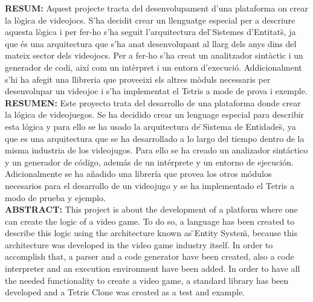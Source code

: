 \documentclass{book}
\begin{document}
\begin{onehalfspace}

{\bf RESUM:} Aquest projecte tracta del desenvolupament d'una plataforma on crear la lògica de videojocs. S'ha decidit crear un llenguatge especial per a descriure aquesta lògica i per fer-ho s'ha seguit l'arquitectura del \"{}Sistemes d'Entitats\"{}, ja que és una arquitectura que s'ha anat desenvolupant al llarg dels anys dins del mateix sector dels videojocs. Per a fer-ho s'ha creat un analitzador sintàctic i un generador de codi, així com un intèrpret i un entorn d'execució. Addicionalment s'hi ha afegit una llibreria que proveeixi els altres mòduls necessaris per desenvolupar un videojoc i s'ha implementat el Tetris a mode de prova i exemple.
\\

{\bf RESUMEN:} Este proyecto trata del desarrollo de una plataforma donde crear la lógica de videojuegos. Se ha decidido crear un lenguage especial para describir esta lógica y para ello se ha usado la arquitectura de \"{}Sistema de Entidades\"{}, ya que es una arquitectura que se ha desarrollado a lo largo del tiempo dentro de la misma industria de los videojugos. Para ello se ha creado un analizador sintáctico y un generador de código, además de un intérprete y un entorno de ejecución. Adicionalmente se ha añadido una librería que provea los otros módulos necesarios para el desarrollo de un videojugo y se ha implementado el Tetris a modo de prueba y ejemplo.
\\

{\bf ABSTRACT:} This project is about the development of a platform where one can create the logic of a video game. To do so, a language has been created to describe this logic using the architecture known as \"{}Entity System\"{}, because this architecture was developed in the video game industry itself. In order to accomplish that, a parser and a code generator have been created, also a code interpreter and an execution environment have been added. In order to have all the needed functionality to create a video game, a standard library has been developed and a Tetris Clone was created as a test and example.

\end{onehalfspace}
\end{document}
